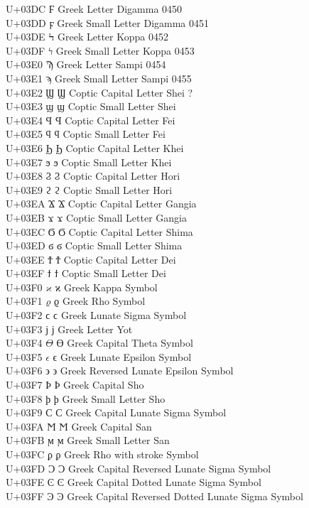 \documentclass{article}
\begin{document}
U+03DC  Ϝ Greek Letter Digamma  0450\\
U+03DD  ϝ Greek Small Letter Digamma  0451\\
U+03DE  Ϟ Greek Letter Koppa  0452\\
U+03DF  ϟ Greek Small Letter Koppa  0453\\
U+03E0  Ϡ Greek Letter Sampi  0454\\
U+03E1  ϡ Greek Small Letter Sampi  0455\\
U+03E2  $Ϣ$ Ϣ Coptic Capital Letter Shei  ?\\
U+03E3  $ϣ$ ϣ Coptic Small Letter Shei\\
U+03E4  $Ϥ$ Ϥ Coptic Capital Letter Fei\\
U+03E5  $ϥ$ ϥ Coptic Small Letter Fei\\
U+03E6  $Ϧ$ Ϧ Coptic Capital Letter Khei\\
U+03E7  $ϧ$ ϧ Coptic Small Letter Khei\\
U+03E8  $Ϩ$ Ϩ Coptic Capital Letter Hori\\
U+03E9  $ϩ$ ϩ Coptic Small Letter Hori\\
U+03EA  $Ϫ$ Ϫ Coptic Capital Letter Gangia\\
U+03EB  $ϫ$ ϫ Coptic Small Letter Gangia\\
U+03EC  $Ϭ$ Ϭ Coptic Capital Letter Shima\\
U+03ED  $ϭ$ ϭ Coptic Small Letter Shima\\
U+03EE  $Ϯ$ Ϯ Coptic Capital Letter Dei\\
U+03EF  $ϯ$ ϯ Coptic Small Letter Dei\\
U+03F0  $ϰ$ ϰ Greek Kappa Symbol\\
U+03F1  $ϱ$ ϱ Greek Rho Symbol\\
U+03F2  $ϲ$ ϲ Greek Lunate Sigma Symbol\\
U+03F3  $ϳ$ ϳ Greek Letter Yot\\
U+03F4  $ϴ$ ϴ Greek Capital Theta Symbol\\
U+03F5  $ϵ$ ϵ Greek Lunate Epsilon Symbol\\
U+03F6  $϶$ ϶ Greek Reversed Lunate Epsilon Symbol\\
U+03F7  $Ϸ$ Ϸ Greek Capital Sho\\
U+03F8  $ϸ$ ϸ Greek Small Letter Sho\\
U+03F9  $Ϲ$ Ϲ Greek Capital Lunate Sigma Symbol\\
U+03FA  $Ϻ$ Ϻ Greek Capital San\\
U+03FB  $ϻ$ ϻ Greek Small Letter San\\
U+03FC  $ϼ$ ϼ Greek Rho with stroke Symbol\\
U+03FD  $Ͻ$ Ͻ Greek Capital Reversed Lunate Sigma Symbol\\
U+03FE  $Ͼ$ Ͼ Greek Capital Dotted Lunate Sigma Symbol\\
U+03FF  $Ͽ$ Ͽ Greek Capital Reversed Dotted Lunate Sigma Symbol\\
\end{document}
